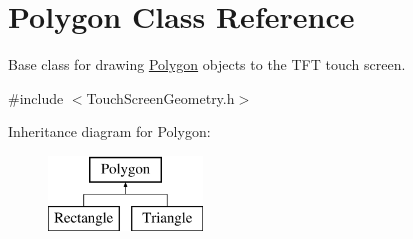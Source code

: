 \hypertarget{class_polygon}{\section{Polygon Class Reference}
\label{class_polygon}
}


Base class for drawing \hyperlink{class_polygon}{Polygon} objects to the T\+F\+T touch screen.  




{\ttfamily \#include $<$Touch\+Screen\+Geometry.\+h$>$}

Inheritance diagram for Polygon\+:\begin{figure}[H]
\begin{center}
\leavevmode
\includegraphics[height=2.000000cm]{class_polygon}
\end{center}
\end{figure}
